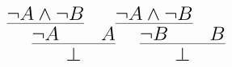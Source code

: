 \documentclass[14pt,border=2pt]{standalone}
\begin{document}
        $$
        \LARGE 

\begin{prooftree}
\hypo{\neg A \land \neg B}
\infer1{\neg A}
\hypo{A}
\infer2{\bot}
\end{prooftree}
\begin{prooftree}
\hypo{\neg A \land \neg B}
\infer1{\neg B}
\hypo{B}
\infer2{\bot}
\end{prooftree}
        $$
        
\end{document}
